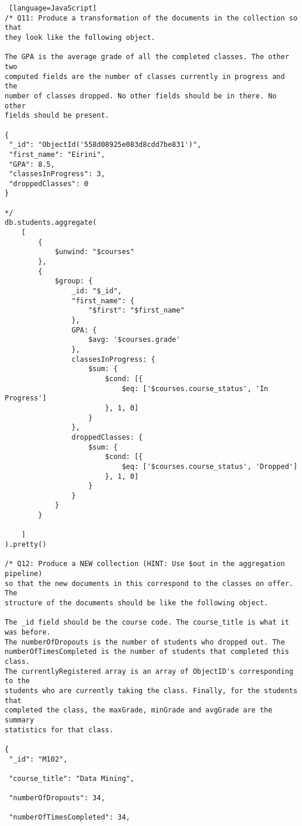 \documentclass[11pt]{article}
\begin{document}
\begin{lstlisting} [language=JavaScript]
/* Q11: Produce a transformation of the documents in the collection so that
they look like the following object.

The GPA is the average grade of all the completed classes. The other two
computed fields are the number of classes currently in progress and the
number of classes dropped. No other fields should be in there. No other
fields should be present.

{
 "_id": "ObjectId('558d08925e083d8cdd7be831')",
 "first_name": "Eirini",
 "GPA": 8.5,
 "classesInProgress": 3,
 "droppedClasses": 0
}

*/
db.students.aggregate(
    [
        {
            $unwind: "$courses"
        },
        {
            $group: {
                _id: "$_id",
                "first_name": {
                    "$first": "$first_name"
                },
                GPA: {
                    $avg: '$courses.grade'
                },
                classesInProgress: {
                    $sum: {
                        $cond: [{
                            $eq: ['$courses.course_status', 'In Progress']
                        }, 1, 0]
                    }
                },
                droppedClasses: {
                    $sum: {
                        $cond: [{
                            $eq: ['$courses.course_status', 'Dropped']
                        }, 1, 0]
                    }
                }
            }
        }

    ]
).pretty()

/* Q12: Produce a NEW collection (HINT: Use $out in the aggregation pipeline)
so that the new documents in this correspond to the classes on offer. The
structure of the documents should be like the following object. 

The _id field should be the course code. The course_title is what it was before. 
The numberOfDropouts is the number of students who dropped out. The
numberOfTimesCompleted is the number of students that completed this class.
The currentlyRegistered array is an array of ObjectID's corresponding to the
students who are currently taking the class. Finally, for the students that
completed the class, the maxGrade, minGrade and avgGrade are the summary
statistics for that class.

{
 "_id": "M102",

 "course_title": "Data Mining",

 "numberOfDropouts": 34,

 "numberOfTimesCompleted": 34,


\end{lstlisting}
\end{document}
